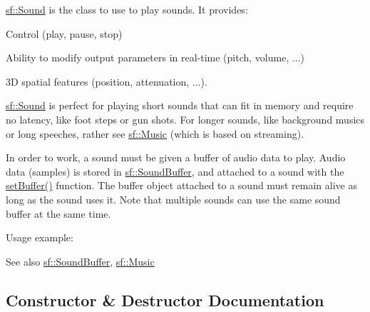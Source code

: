 \mbox{\hyperlink{classsf_1_1_sound}{sf\+::\+Sound}} is the class to use to play sounds. It provides\+: \begin{DoxyItemize}
\item Control (play, pause, stop) \item Ability to modify output parameters in real-\/time (pitch, volume, ...) \item 3D spatial features (position, attenuation, ...).\end{DoxyItemize}
\mbox{\hyperlink{classsf_1_1_sound}{sf\+::\+Sound}} is perfect for playing short sounds that can fit in memory and require no latency, like foot steps or gun shots. For longer sounds, like background musics or long speeches, rather see \mbox{\hyperlink{classsf_1_1_music}{sf\+::\+Music}} (which is based on streaming).

In order to work, a sound must be given a buffer of audio data to play. Audio data (samples) is stored in \mbox{\hyperlink{classsf_1_1_sound_buffer}{sf\+::\+Sound\+Buffer}}, and attached to a sound with the \mbox{\hyperlink{classsf_1_1_sound_a8b395e9713d0efa48a18628c8ec1972e}{set\+Buffer()}} function. The buffer object attached to a sound must remain alive as long as the sound uses it. Note that multiple sounds can use the same sound buffer at the same time.

Usage example\+: 
\begin{DoxyCode}{0}
\DoxyCodeLine{}
\end{DoxyCode}


\begin{DoxySeeAlso}{See also}
\mbox{\hyperlink{classsf_1_1_sound_buffer}{sf\+::\+Sound\+Buffer}}, \mbox{\hyperlink{classsf_1_1_music}{sf\+::\+Music}} \begin{DoxyVerb}\end{DoxyVerb}
 
\end{DoxySeeAlso}


\subsection{Constructor \& Destructor Documentation}
\mbox{\label{classsf_1_1_sound_a36ab74beaaa953d9879c933ddd246282}} 

